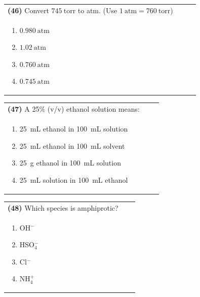 \documentclass{article}
\begin{document}
\noindent\begin{tabular}{|p{0.9\linewidth}|}
\hline
\textbf{(46)} Convert $745~\text{torr}$ to atm. (Use $1~\text{atm}=760~\text{torr}$) \\
\begin{minipage}[t]{0.85\linewidth}
\begin{enumerate}[label=\alph*.]
    \item $0.980~\text{atm}$
    \item $1.02~\text{atm}$
    \item $0.760~\text{atm}$
    \item $0.745~\text{atm}$
\end{enumerate}
\end{minipage}\\[0.2cm]
\hline
\end{tabular}

\noindent\begin{tabular}{|p{0.9\linewidth}|}
\hline
\textbf{(47)} A 25\% (v/v) ethanol solution means:\\[0.2cm]
\begin{minipage}[t]{0.85\linewidth}
\begin{enumerate}[label=\alph*.]
\item 25~mL ethanol in 100~mL solution
\item 25~mL ethanol in 100~mL solvent
\item 25~g ethanol in 100~mL solution
\item 25~mL solution in 100~mL ethanol
\end{enumerate}
\end{minipage}\\[0.2cm]
\hline
\end{tabular}

\noindent\begin{tabular}{|p{0.9\linewidth}|}
\hline
\textbf{(48)} Which species is amphiprotic? \\[0.2cm]
\begin{minipage}{0.85\linewidth}
\begin{enumerate}[label=\alph*.]
\item OH$^-$ \item HSO$_4^-$ \item Cl$^-$ \item NH$_4^+$
\end{enumerate}
\end{minipage}\\[0.2cm]
\hline
\end{tabular}
\end{document}

